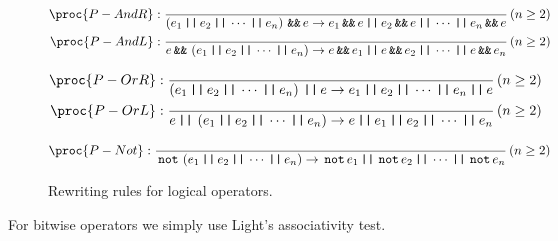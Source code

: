 \begin{figure*}[htbp!]
\begin{align*}
\proc{P-AndR}:{\over
\p{e_1 \LOR e_2 \LOR \cdots \LOR e_n} \LAND e \rightarrow e_1\LAND e \LOR
e_2\LAND e \LOR \cdots \LOR e_n \LAND e
}\p{n\geq 2}\\
\proc{P-AndL}:{\over
e\LAND\p{e_1 \LOR e_2 \LOR \cdots \LOR e_n} \rightarrow e\LAND e_1 \LOR e\LAND
e_2 \LOR \cdots
\LOR e\LAND e_n
}\p{n\geq 2}
\end{align*}

\begin{align*}
\proc{P-OrR}:{\over
\p{e_1 \LOR e_2 \LOR \cdots \LOR e_n} \LOR e \rightarrow e_1 \LOR e_2 \LOR
\cdots \LOR e_n \LOR e
}\p{n\geq 2}\\
\proc{P-OrL}:{\over
e \LOR \p{e_1 \LOR e_2 \LOR \cdots \LOR e_n} \rightarrow e \LOR e_1 \LOR e_2
\LOR \cdots \LOR e_n
}\p{n\geq 2}
\end{align*}

\begin{align*}
\proc{P-Not}:{\over
\LNOT\p{e_1 \LOR e_2 \LOR \cdots \LOR e_n} \rightarrow \LNOT e_1 \LOR \LNOT e_2
\LOR \cdots \LOR \LNOT e_n
}\p{n\geq 2}
\end{align*}

\caption[]{Rewriting rules for logical operators.}
\label{figure:rewriting-logop}
\end{figure*}

For bitwise operators we simply use Light's associativity test. 





